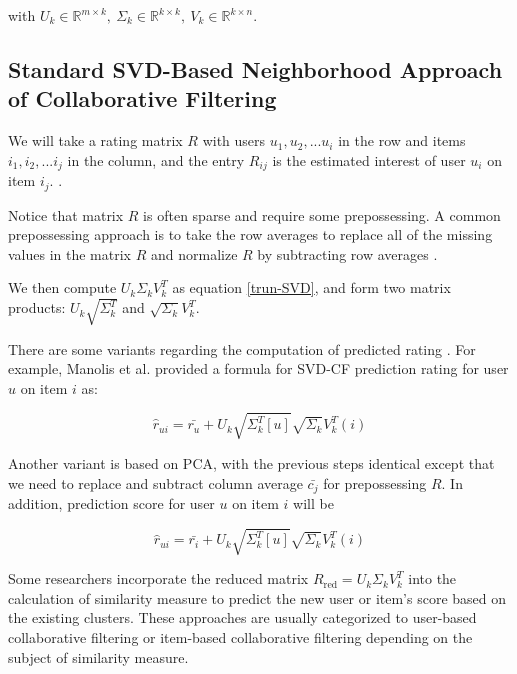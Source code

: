 \documentclass[letter paper, 11pt]{article}
\begin{document}
	with $U_k \in \mathbb{R}^{m \times k}, \ \Sigma_k \in \mathbb{R}^{k \times k}, \ V_k \in \mathbb{R}^{k \times n}$.
	
	\subsection{Standard SVD-Based Neighborhood Approach of Collaborative Filtering}	
	We will take a rating matrix $R$ with users $u_1, u_2, ... u_i$ in the row and items $i_1, i_2, ... i_j$ in the column, and the entry $R_{ij}$ is the estimated interest of user $u_i$ on item $i_j$. \cite{MFinRS} \cite{CF-IterPCA} \cite{ApplySVD}.
	
	Notice that matrix $R$ is often sparse and require some prepossessing. A common prepossessing approach is to take the row averages to replace all of the missing values in the matrix $R$ and normalize $R$ by subtracting row averages \cite{ApplySVD} \cite{CF-IterPCA}.
	
	We then compute $U_k \Sigma_k V_k^T$ as equation \ref{trun-SVD}, and form two matrix products: $U_k \sqrt{\Sigma_k^T}$ and $\sqrt{\Sigma_k} V_k^T$.
	
	There are some variants regarding the computation of predicted rating \cite{ApplySVD} \cite{SVD-performance}. For example, Manolis et al. \cite{SVD-performance} provided a formula for SVD-CF prediction rating for user $u$ on item $i$ as:
	
	\begin{equation}
		\hat{r}_{ui} = \bar{r_u} + U_k \sqrt{\Sigma_k^T [u]} \sqrt{\Sigma_k} V_k^T (i)
	\end{equation}
	
	Another variant is based on PCA, with the previous steps identical except that we need to replace and subtract column average $\bar{c_j}$ for prepossessing $R$. In addition, prediction score for user $u$ on item $i$ will be
	
	\begin{equation}
		\hat{r}_{ui} = \bar{r_i} + U_k \sqrt{\Sigma_k^T [u]} \sqrt{\Sigma_k} V_k^T (i)
	\end{equation}

	Some researchers incorporate the reduced matrix $R_{\text{red}} = U_k \Sigma_k V_k^T$ into the calculation of similarity measure to predict the new user or item's score based on the existing clusters. These approaches are usually categorized to user-based collaborative filtering or item-based collaborative filtering depending on the subject of similarity measure.
	
\end{document}
